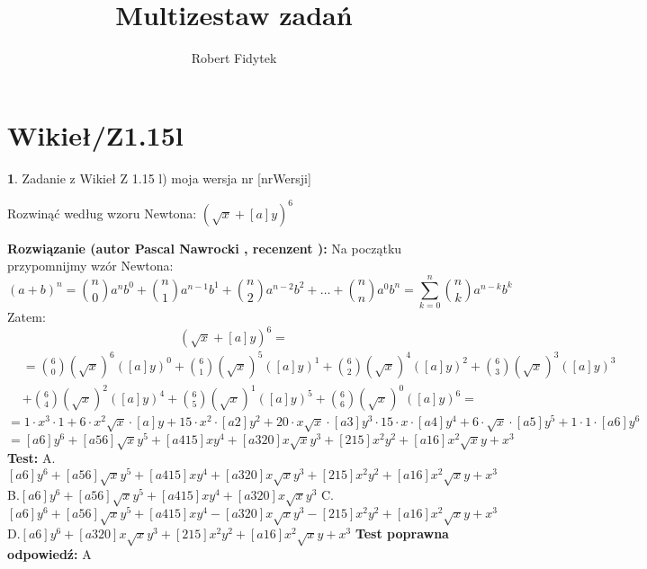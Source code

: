 \documentclass[12pt, a4paper]{article}
\title{Multizestaw zadań}
\author{Robert Fidytek}
\date{}
\theoremstyle{definition} %
\newtheorem{zad}{}
\newcommand{\kategoria}[1]{\section{#1}} %
\newcommand{\zadStart}[1]{\begin{zad}#1\newline} %
\newcommand{\zadStop}{\end{zad}}   %
\newcommand{\rozwStart}[2]{\noindent \textbf{Rozwiązanie (autor #1 , recenzent #2): }\newline} %
\newcommand{\odpStop}{\newline}                                             %
\newcommand{\testStart}{\noindent \textbf{Test:}\newline} %
\newcommand{\testStop}{\newline} %
\newcommand{\kluczStart}{\noindent \textbf{Test poprawna odpowiedź:}\newline} %
\newcommand{\kluczStop}{\newline} %
\begin{document}
\maketitle



\kategoria{Wikieł/Z1.15l}
\zadStart{Zadanie z Wikieł Z 1.15 l) moja wersja nr [nrWersji]}


Rozwinąć według wzoru Newtona: $(\sqrt{x}+[a]y)^6$
\zadStop
\rozwStart{Pascal Nawrocki}{}
Na początku przypomnijmy wzór Newtona:$$(a+b)^n={n\choose 0}a^{n}b^{0}+{n\choose 1}a^{n-1}b^{1}+{n\choose 2}a^{n-2}b^{2}+\dots+{n\choose n}a^{0}b^{n}=\sum_{k=0}^{n} {n\choose k}a^{n-k}b^{k}$$
Zatem:
$$(\sqrt{x}+[a]y)^6=$$
\begin{equation}
\begin{split}
&={6\choose0}(\sqrt{x})^6([a]y)^0+{6\choose1}(\sqrt{x})^5([a]y)^1+{6\choose2}(\sqrt{x})^4([a]y)^2+{6\choose3}(\sqrt{x})^3([a]y)^3\\&+{6\choose4}(\sqrt{x})^2([a]y)^4+{6\choose5}(\sqrt{x})^1([a]y)^5+{6\choose6}(\sqrt{x})^0([a]y)^6=
\end{split}
\end{equation}
$$=1\cdot x^3\cdot1+6\cdot x^2\sqrt{x}\cdot[a]y+15\cdot x^2\cdot[a2]y^2+20\cdot x\sqrt{x}\cdot[a3]y^3\cdot15\cdot x\cdot[a4]y^4+6\cdot \sqrt{x}\cdot[a5]y^5+1\cdot1\cdot[a6]y^6$$
$$=[a6]y^6+[a56]\sqrt{x}y^5+[a415]xy^4+[a320]x\sqrt{x}y^3+[215]x^2y^2+[a16]x^2\sqrt{x}y+x^3$$
\odpStop
\testStart
A.$[a6]y^6+[a56]\sqrt{x}y^5+[a415]xy^4+[a320]x\sqrt{x}y^3+[215]x^2y^2+[a16]x^2\sqrt{x}y+x^3$
B.$[a6]y^6+[a56]\sqrt{x}y^5+[a415]xy^4+[a320]x\sqrt{x}y^3$
C.$[a6]y^6+[a56]\sqrt{x}y^5+[a415]xy^4-[a320]x\sqrt{x}y^3-[215]x^2y^2+[a16]x^2\sqrt{x}y+x^3$
D.$[a6]y^6+[a320]x\sqrt{x}y^3+[215]x^2y^2+[a16]x^2\sqrt{x}y+x^3$
\testStop
\kluczStart
A
\kluczStop
\end{document}
